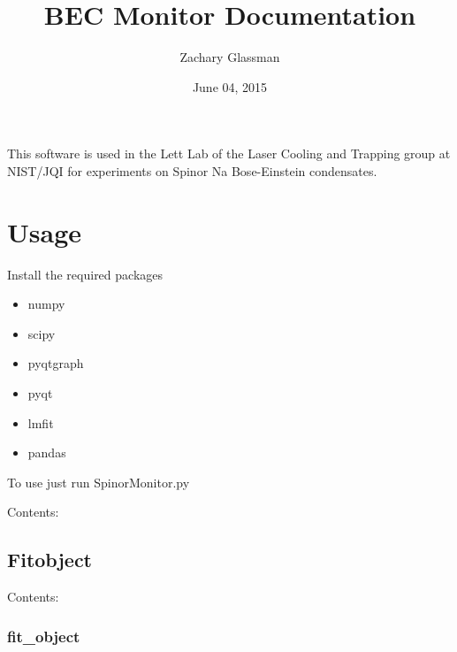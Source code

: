 \documentclass[letterpaper,10pt,english]{sphinxmanual}
\title{BEC Monitor Documentation}
\date{June 04, 2015}
\author{Zachary Glassman}
\begin{document}
\maketitle
\tableofcontents
{}\label{index::doc}


This software is used in the Lett Lab of the Laser Cooling and
Trapping group at NIST/JQI for experiments on Spinor Na Bose-Einstein
condensates.


\chapter{Usage}
\label{index:bec-monitor}\label{index:usage}
Install the required packages
\begin{itemize}
\item {} 
numpy

\item {} 
scipy

\item {} 
pyqtgraph

\item {} 
pyqt

\item {} 
lmfit

\item {} 
pandas

\end{itemize}

To use just run SpinorMonitor.py

Contents:


\section{Fitobject}
\label{Fitobject::doc}\label{Fitobject:fitobject}
Contents:


\subsection{fit\_object}
\label{fit_object:fit-object}\label{fit_object::doc}
\end{document}
